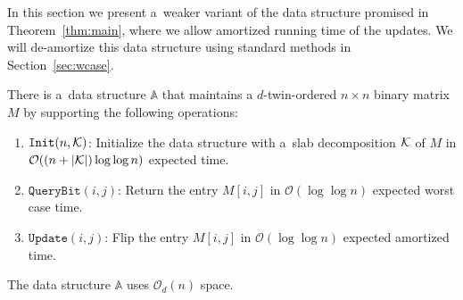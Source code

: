 \documentclass[runningheads]{llncs}
\newcommand{\Oh}{\mathcal{O}}
\begin{document}
In this section we present a~weaker variant of the data structure promised in Theorem~\ref{thm:main}, where we allow amortized running time of the updates. We will de-amortize this data structure using standard methods in Section~\ref{sec:wcase}.


\begin{theorem}\label{thm:amortized}
There is a~data structure $\mathbb{A}$ that maintains a
$d$-twin-ordered $n\times n$ binary matrix $M$
by supporting the following operations:
\begin{enumerate}
 \item $\mathtt{Init}(n, \cal K)$: Initialize the data structure
with a~slab decomposition $\cal K$ of $M$ in
$\Oh((n + |{\cal K}|) \log \log n)$ expected time.
 \item $\mathtt{QueryBit}(i,j)$: Return the entry $M[i, j]$ in
 $\Oh(\log \log n)$ expected worst case time.
 \item $\mathtt{Update}(i, j)$: Flip the entry $M[i, j]$ in
 $\Oh(\log \log n)$ expected amortized time.
\end{enumerate}
The data structure $\mathbb{A}$ uses $\Oh_d(n)$ space.
\end{theorem}
\end{document}
